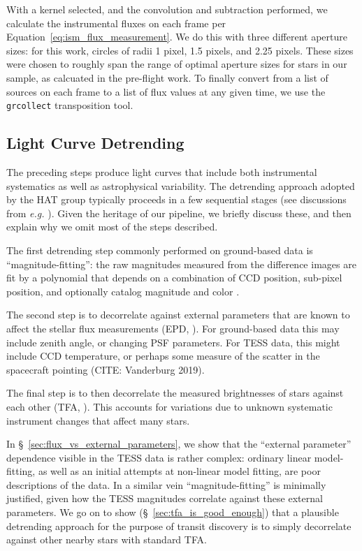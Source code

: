 \documentclass[12pt,twocolumn,tighten]{aastex62}
\begin{document}
With a kernel selected, and the convolution and subtraction performed, 
we calculate the instrumental fluxes on each frame per 
Equation~\ref{eq:ism_flux_measurement}. 
We do this with three different aperture sizes: for this work, circles
of radii 1 pixel, 1.5 pixels, and 2.25 pixels.
These sizes were chosen to roughly span the range of optimal aperture
sizes for stars in our sample, as calcuated in the pre-flight
\citet{Sullivan_et_al_2015} work.
To finally convert from a list of 
sources on each frame to a list of flux values at any given time, we use the 
\texttt{grcollect} transposition tool.

\subsection{Light Curve Detrending}
\label{subsec:lcdetrending}

The preceding steps produce light curves that include both instrumental
systematics as well as astrophysical variability.  The detrending
approach adopted by the HAT group typically proceeds in a few
sequential stages (see discussions from {\it e.g.}
\citealt{bakos_2010,huang_high-precision_2015,zhang_precision_2016}).
Given the heritage of our pipeline, we briefly discuss these, and then
explain why we omit most of the steps described.

The first detrending step commonly performed on ground-based data is
``magnitude-fitting'': the raw magnitudes measured from the difference
images are fit by a polynomial that depends on a combination of CCD
position, sub-pixel position, and optionally catalog magnitude and
color \citep[][Sec.~5.5]{zhang_precision_2016}.

The second step is to decorrelate against external parameters that are
known to affect the stellar flux measurements (EPD,
\citealt[][~Appendix]{bakos_2010}).  For ground-based data this may include zenith
angle, or changing PSF parameters.  For TESS data, this might include
CCD temperature, or perhaps some measure of the scatter in the spacecraft
pointing (CITE: Vanderburg 2019).

The final step is to then decorrelate the measured brightnesses of
stars against each other (TFA, \citealt{kovacs_trend_2005}).  
This accounts for variations due to unknown systematic
instrument changes that affect many stars.


In \S~\ref{sec:flux_vs_external_parameters}, we show that the
``external parameter'' dependence visible in the TESS data is rather
complex: ordinary linear model-fitting, as well as an initial attempts
at non-linear model fitting, are poor descriptions of the data.  
In a similar vein ``magnitude-fitting'' is minimally justified, given
how the TESS magnitudes correlate against these external parameters.
We go on to show (\S~\ref{sec:tfa_is_good_enough}) that a plausible
detrending approach for the purpose of transit discovery is to simply
decorrelate against other nearby stars with standard TFA.
\end{document}
